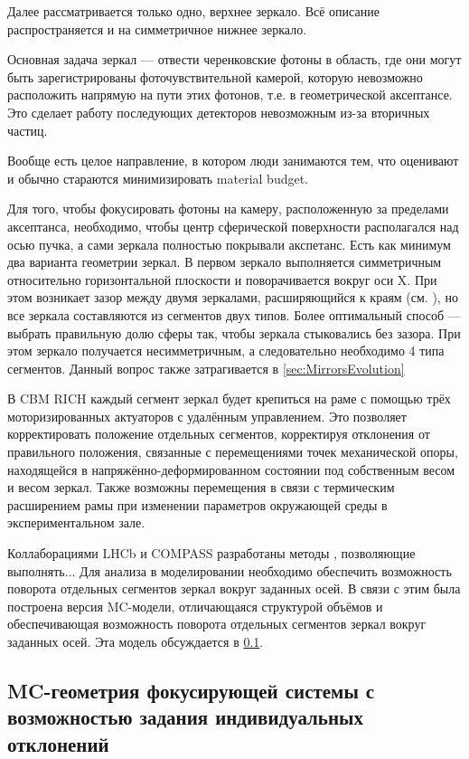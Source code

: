 Далее рассматривается только одно, верхнее зеркало. Всё описание распространяется и на симметричное нижнее зеркало.

Основная задача зеркал --- отвести черенковские фотоны в область, где они могут быть зарегистрированы фоточувствительной камерой, которую невозможно расположить напрямую на пути этих фотонов, т.е. в геометрической аксептансе. Это сделает работу последующих детекторов невозможным из-за вторичных частиц.

Вообще есть целое направление, в котором люди занимаются тем, что оценивают и обычно стараются минимизировать material budget.

Для того, чтобы фокусировать фотоны на камеру, расположенную за пределами аксептанса, необходимо, чтобы центр сферической поверхности располагался над осью пучка, а сами зеркала полностью покрывали акспетанс. Есть как минимум два варианта геометрии зеркал. В первом зеркало выполняется симметричным относительно горизонтальной плоскости и поворачивается вокруг оси X. При этом возникает зазор между двумя зеркалами, расширяющийся к краям (см. \figref{}), но все зеркала составляются из сегментов двух типов. Более оптимальный способ --- выбрать правильную долю сферы так, чтобы зеркала стыковались без зазора. При этом зеркало получается несимметричным, а следовательно необходимо 4 типа сегментов. Данный вопрос также затрагивается в \ref{sec:MirrorsEvolution}

В CBM RICH каждый сегмент зеркал будет крепиться на раме с помощью трёх \todo моторизированных актуаторов с удалённым управлением. Это позволяет корректировать положение отдельных сегментов, корректируя отклонения от правильного положения, связанные с перемещениями точек механической опоры, находящейся в напряжённо-деформированном состоянии под собственным весом и весом зеркал. Также возможны перемещения в связи с термическим расширением рамы при изменении параметров окружающей среды в экспериментальном зале.

Коллаборациями LHCb и COMPASS разработаны методы \todo, позволяющие выполнять...
Для анализа в моделировании необходимо обеспечить возможность поворота отдельных сегментов зеркал вокруг заданных осей. В связи с этим была построена версия MC-модели, отличающаяся структурой объёмов и обеспечивающая возможность поворота отдельных сегментов зеркал вокруг заданных осей. Эта модель обсуждается в \ref{sec:RICHgeoMirrorMis}.

\subsection{MC-геометрия фокусирующей системы с возможностью задания индивидуальных отклонений}\label{sec:RICHgeoMirrorMis}

